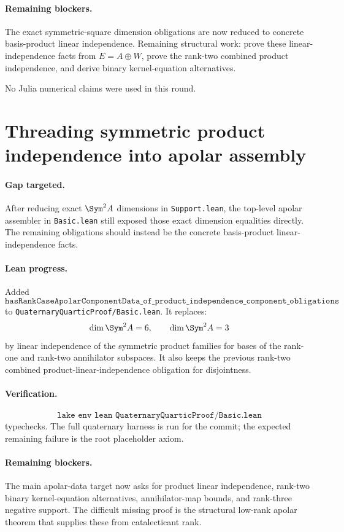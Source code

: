 \documentclass[11pt]{article}
\begin{document}
\paragraph{Remaining blockers.}
The exact symmetric-square dimension obligations are now reduced to concrete
basis-product linear independence.  Remaining structural work: prove these
linear-independence facts from \(E=A\oplus W\), prove the rank-two combined
product independence, and derive binary kernel-equation alternatives.

No Julia numerical claims were used in this round.

\section*{Threading symmetric product independence into apolar assembly}

\paragraph{Gap targeted.}
After reducing exact \(\Sym^2A\) dimensions in \texttt{Support.lean}, the
top-level apolar assembler in \texttt{Basic.lean} still exposed those exact
dimension equalities directly.  The remaining obligations should instead be
the concrete basis-product linear-independence facts.

\paragraph{Lean progress.}
Added
\[
\texttt{hasRankCaseApolarComponentData\_of\_product\_independence\_component\_obligations}
\]
to \texttt{QuaternaryQuarticProof/Basic.lean}.  It replaces:
\[
\dim\Sym^2A=6,\qquad \dim\Sym^2A=3
\]
by linear independence of the symmetric product families for bases of the
rank-one and rank-two annihilator subspaces.  It also keeps the previous
rank-two combined product-linear-independence obligation for disjointness.

\paragraph{Verification.}
\[
\texttt{lake env lean QuaternaryQuarticProof/Basic.lean}
\]
typechecks.  The full quaternary harness is run for the commit; the expected
remaining failure is the root placeholder axiom.

\paragraph{Remaining blockers.}
The main apolar-data target now asks for product linear independence,
rank-two binary kernel-equation alternatives, annihilator-map bounds, and
rank-three negative support.  The difficult missing proof is the structural
low-rank apolar theorem that supplies these from catalecticant rank.
\end{document}
